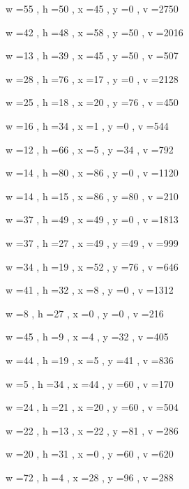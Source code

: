 \documentclass[11pt]{article}
\begin{document}
w =55 , h =50 , x =45 , y =0 , v =2750
\par
w =42 , h =48 , x =58 , y =50 , v =2016
\par
w =13 , h =39 , x =45 , y =50 , v =507
\par
w =28 , h =76 , x =17 , y =0 , v =2128
\par
w =25 , h =18 , x =20 , y =76 , v =450
\par
w =16 , h =34 , x =1 , y =0 , v =544
\par
w =12 , h =66 , x =5 , y =34 , v =792
\par
\newpage




w =14 , h =80 , x =86 , y =0 , v =1120
\par
w =14 , h =15 , x =86 , y =80 , v =210
\par
w =37 , h =49 , x =49 , y =0 , v =1813
\par
w =37 , h =27 , x =49 , y =49 , v =999
\par
w =34 , h =19 , x =52 , y =76 , v =646
\par
w =41 , h =32 , x =8 , y =0 , v =1312
\par
w =8 , h =27 , x =0 , y =0 , v =216
\par
w =45 , h =9 , x =4 , y =32 , v =405
\par
w =44 , h =19 , x =5 , y =41 , v =836
\par
w =5 , h =34 , x =44 , y =60 , v =170
\par
w =24 , h =21 , x =20 , y =60 , v =504
\par
w =22 , h =13 , x =22 , y =81 , v =286
\par
w =20 , h =31 , x =0 , y =60 , v =620
\par
w =72 , h =4 , x =28 , y =96 , v =288
\par
\newpage
\end{document}
